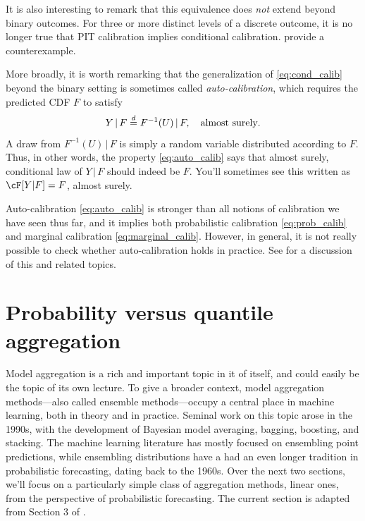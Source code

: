 \documentclass{article}
\begin{document}
It is also interesting to remark that this equivalence does \emph{not} extend
beyond binary outcomes. For three or more distinct levels of a discrete outcome,
it is no longer true that PIT calibration implies conditional
calibration. \citet{gneiting2022regression} provide a counterexample.  

More broadly, it is worth remarking that the generalization of
\eqref{eq:cond_calib} beyond the binary setting is sometimes called
\emph{auto-calibration}, which requires the predicted CDF $F$ to satisfy  
\begin{equation}  
\label{eq:auto_calib}
Y \,|\, F \overset{d}{=} F^{-1}(U) \,|\, F, \quad \text{almost surely}.   
\end{equation}
A draw from $F^{-1}(U) \,|\, F$ is simply a random variable distributed
according to $F$. Thus, in other words, the property \eqref{eq:auto_calib} says
that almost surely, conditional law of $Y \,|\, F$ should indeed be $F$. You'll 
sometimes see this written as $\cF[Y|F] = F$, almost surely. 

Auto-calibration \eqref{eq:auto_calib} is stronger than all notions of
calibration we have seen thus far, and it implies both probabilistic calibration
\eqref{eq:prob_calib} and marginal calibration
\eqref{eq:marginal_calib}. However, in general, it is not really possible to
check whether auto-calibration holds in practice. See
\citet{gneiting2022regression} for a discussion of this and related topics.

\section{Probability versus quantile aggregation}
\label{sec:prob_quant}

Model aggregation is a rich and important topic in it of itself, and could
easily be the topic of its own lecture. To give a broader context, model
aggregation methods---also called ensemble methods---occupy a central place in
machine learning, both in theory and in practice. Seminal work on this topic
arose in the 1990s, with the development of Bayesian model averaging, bagging,
boosting, and stacking. The machine learning literature has mostly focused on
ensembling point predictions, while ensembling distributions have a had an even 
longer tradition in probabilistic forecasting, dating back to the 1960s. Over
the next two sections, we'll focus on a particularly simple class of aggregation 
methods, linear ones, from the perspective of probabilistic forecasting. The
current section is adapted from Section 3 of  \citet{fakoor2021flexible}.
\end{document}
